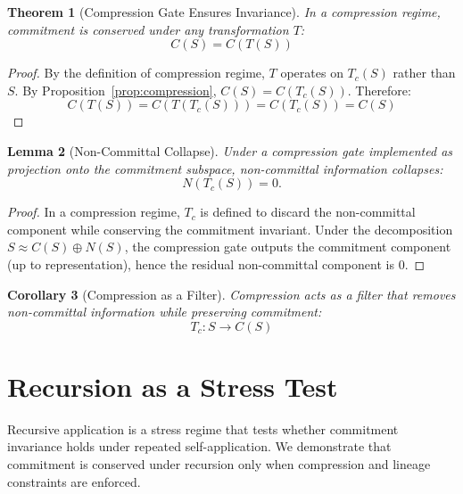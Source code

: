 \documentclass[11pt,a4paper]{article}
\newtheorem{theorem}{Theorem}[section]
\newtheorem{lemma}[theorem]{Lemma}
\newtheorem{corollary}[theorem]{Corollary}
\begin{document}
\begin{theorem}[Compression Gate Ensures Invariance]
\label{thm:gate}
In a compression regime, commitment is conserved under any transformation $T$:
\begin{equation}
C(S) = C(T(S))
\end{equation}
\end{theorem}

\begin{proof}
By the definition of compression regime, $T$ operates on $T_c(S)$ rather than $S$. By Proposition~\ref{prop:compression}, $C(S) = C(T_c(S))$. Therefore:
\begin{equation}
C(T(S)) = C(T(T_c(S))) = C(T_c(S)) = C(S)
\end{equation}
\end{proof}

\begin{lemma}[Non-Committal Collapse]
\label{lem:collapse}
Under a compression gate implemented as projection onto the commitment subspace, non-committal information collapses:
\begin{equation}
N(T_c(S)) = 0.
\end{equation}
\end{lemma}

\begin{proof}
In a compression regime, $T_c$ is defined to discard the non-committal component while conserving the commitment invariant. Under the decomposition $S \approx C(S) \oplus N(S)$, the compression gate outputs the commitment component (up to representation), hence the residual non-committal component is $0$.
\end{proof}

\begin{corollary}[Compression as a Filter]
Compression acts as a filter that removes non-committal information while preserving commitment:
\begin{equation}
T_c: S \rightarrow C(S)
\end{equation}
\end{corollary}

\section{Recursion as a Stress Test}
\label{sec:recursion}

Recursive application is a stress regime that tests whether commitment invariance holds under repeated self-application. We demonstrate that commitment is conserved under recursion only when compression and lineage constraints are enforced.
\end{document}
